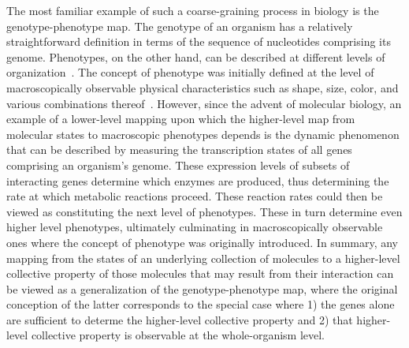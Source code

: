 The most familiar example of such a coarse-graining process in biology is the genotype-phenotype map. The genotype of an organism has a relatively straightforward definition in terms of the sequence of nucleotides comprising its genome. Phenotypes, on the other hand, can be described at different levels of organization~\cite{Dawkins1982,Stadler2001}. The concept of phenotype was initially defined at the level of macroscopically observable physical characteristics such as shape, size, color, and various combinations thereof~\cite{Johannsen1911}. However, since the advent of molecular biology, an example of a lower-level mapping upon which the higher-level map from molecular states to macroscopic phenotypes depends is the dynamic phenomenon that can be described by measuring the transcription states of all genes comprising an organism's genome.  These expression levels of subsets of interacting genes determine which enzymes are produced, thus determining the rate at which metabolic reactions proceed.  These reaction rates could then be viewed as constituting the next level of phenotypes.  These in turn determine even higher level phenotypes, ultimately culminating in macroscopically observable ones where the concept of phenotype was originally introduced. In summary, any mapping from the states of an underlying collection of molecules to a higher-level collective property of those molecules that may result from their interaction can be viewed as a generalization of the genotype-phenotype map, where the original conception of the latter corresponds to the special case where 1) the genes alone are sufficient to determe the higher-level collective property and 2) that higher-level collective property is observable at the whole-organism level.

